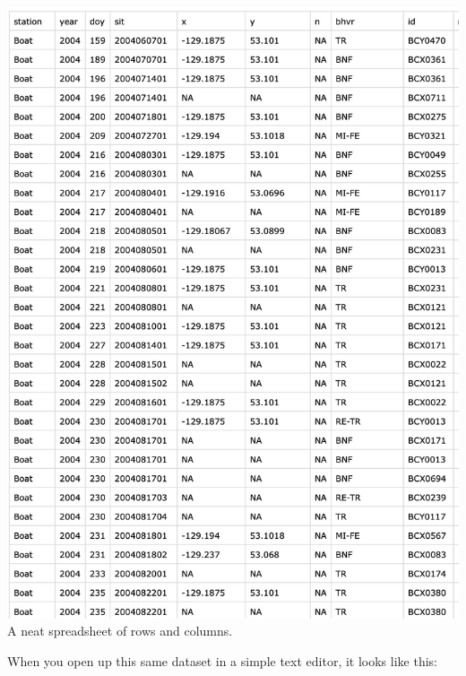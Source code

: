 \documentclass[
]{book}
\begin{document}
\includegraphics{img/csv.png}
A neat spreadsheet of rows and columns.

When you open up this same dataset in a simple text editor, it looks like this:
\end{document}
